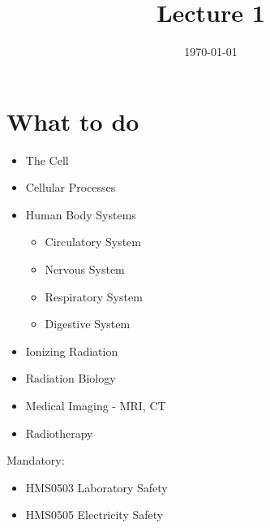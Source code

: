 \documentclass[]{scrartcl}
\title{Lecture 1}
\author{}
\date{\today}
\begin{document}
\maketitle
\newpage
\tableofcontents
\newpage

\section{What to do}

\begin{itemize}
	\item The Cell
	\item Cellular Processes
	\item Human Body Systems
		\begin{itemize}
		\item Circulatory System
		\item Nervous System
		\item Respiratory System
		\item Digestive System
		\end{itemize}
	\item Ionizing Radiation
	\item Radiation Biology
	\item Medical Imaging - MRI, CT
	\item Radiotherapy
\end{itemize}

Mandatory:
\begin{itemize}
	\item HMS0503 Laboratory Safety
	\item HMS0505 Electricity Safety
\end{itemize}
\end{document}
